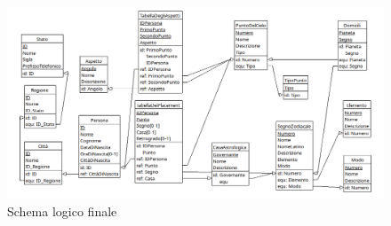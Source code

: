 \begin{figure}
  \includegraphics[width=\textwidth,height=\textheight,keepaspectratio]{img/finalschemelogic.png}
  \caption{Schema logico finale}
  \label{fig:finalschemelogic}
\end{figure}

\newpage

